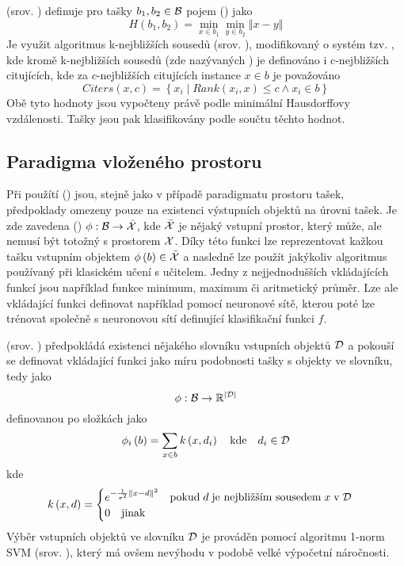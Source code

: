  (srov. \cite{wang_solving_2000}) definuje pro tašky \( b_1, b_2 \in \mathcal B \) pojem  () jako
\[ H \left( b_1, b_2 \right) = \min_{x \in b_1} \min_{y \in b_2} \left\Vert x - y \right\Vert \]
Je využit algoritmus k-nejbližších sousedů (srov. \cite{dasarathy_nearest_1991}), modifikovaný o systém tzv. , kde kromě k-nejbližších sousedů (zde nazývaných ) je definováno i c-nejbližších citujících, kde za \( c \)-nejbližších citujících instance \( x \in b \) je považováno
\[ Citers \left( x, c \right) = \left\{ x_i \middle| Rank \left( x_i, x \right) \leq c \land x_i \in b \right\} \]
Obě tyto hodnoty jsou vypočteny právě podle minimální Hausdorffovy vzdálenosti. Tašky jsou pak klasifikovány podle součtu těchto hodnot.

\subsection{Paradigma vloženého prostoru}\label{embedded-space-paradigm}

Při použítí  () jsou, stejně jako v případě paradigmatu prostoru tašek, předpoklady omezeny pouze na existenci výstupních objektů na úrovni tašek. Je zde zavedena  () \( \phi : \mathcal B \to \bar{\mathcal X} \), kde \( \bar{\mathcal X} \) je nějaký vstupní prostor, který může, ale nemusí být totožný s prostorem \( \mathcal X \). Díky této funkci lze reprezentovat kažkou tašku vstupním objektem \( \phi \left( b \right) \in \bar{\mathcal X} \) a nasledně lze použít jakýkoliv algoritmus používaný při klasickém učení s učitelem. Jedny z nejjednodušších vkládajících funkcí jsou například funkce minimum, maximum či aritmetický průměr. Lze ale vkládající funkci definovat například pomocí neuronové sítě, kterou poté lze trénovat společně s neuronovou sítí definující klasifikační funkci \( f \).

 (srov.  \cite{chen_miles:_2006}) předpokládá existenci nějakého slovníku vstupních objektů \( \mathcal D \) a pokouší se definovat vkládající funkci jako míru podobnosti tašky s objekty ve slovníku, tedy jako
\[ \phi : \mathcal B \to \mathbb R^{\left| \mathcal D \right|} \]
definovanou po složkách jako
\[ \phi_i \left( b \right) = \sum_{x \in b} k \left( x, d_i \right) \quad \text{kde} \quad d_i \in \mathcal D \]
kde
\[ k \left( x, d \right) = \begin{cases}
	e^{- \frac{1}{\sigma^2} \left\Vert x - d \right\Vert^2} \quad \text{pokud} \; d \; \text{je nejbližším sousedem} \; x \; \text{v} \; \mathcal D \\
	0 \quad \text{jinak}
\end{cases} \]
Výběr vstupních objektů ve slovníku \( \mathcal D \) je prováděn pomocí algoritmu 1-norm SVM (srov. \cite{zhu_1-norm_2004}), který má ovšem nevýhodu v podobě velké výpočetní náročnosti.

